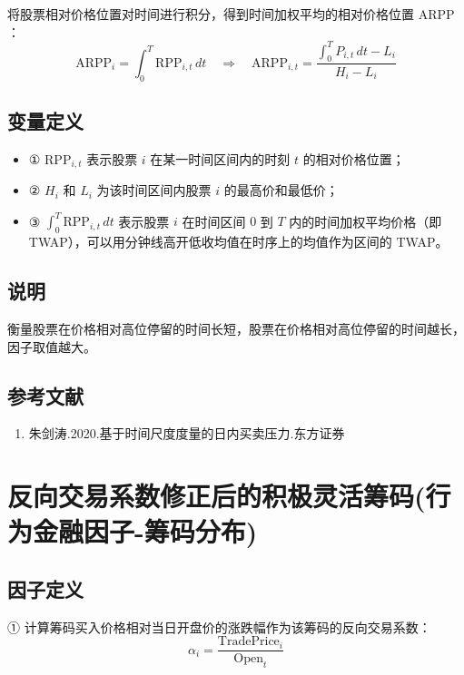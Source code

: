 \documentclass{article}
\begin{document}
将股票相对价格位置对时间进行积分，得到时间加权平均的相对价格位置 \( \mathrm{ARPP} \)：
\begin{equation}
    \mathrm{ARPP}_i = \int_0^T \mathrm{RPP}_{i,t} \, dt \quad \Rightarrow \quad \mathrm{ARPP}_{i,t} = \frac{\int_0^T P_{i,t} \, dt - L_i}{H_i - L_i}
\end{equation}

\subsection{变量定义}
\begin{itemize}
    \item ① \( \mathrm{RPP}_{i,t} \) 表示股票 \( i \) 在某一时间区间内的时刻 \( t \) 的相对价格位置；
    \item ② \( H_i \) 和 \( L_i \) 为该时间区间内股票 \( i \) 的最高价和最低价；
    \item ③ \( \displaystyle \int_0^T \mathrm{RPP}_{i,t} \, dt \) 表示股票 \( i \) 在时间区间 \( 0 \) 到 \( T \) 内的时间加权平均价格（即 TWAP），可以用分钟线高开低收均值在时序上的均值作为区间的 TWAP。
\end{itemize}

\subsection{说明}
衡量股票在价格相对高位停留的时间长短，股票在价格相对高位停留的时间越长，因子取值越大。

\subsection{参考文献}
\begin{enumerate}
    \item 朱剑涛.2020.基于时间尺度度量的日内买卖压力.东方证券
\end{enumerate}

\section{反向交易系数修正后的积极灵活筹码(行为金融因子-筹码分布)}

\subsection{因子定义}
① 计算筹码买入价格相对当日开盘价的涨跌幅作为该筹码的反向交易系数：
\begin{equation}
    \alpha_i = \frac{\mathrm{TradePrice}_i}{\mathrm{Open}_t}
\end{equation}
\end{document}
